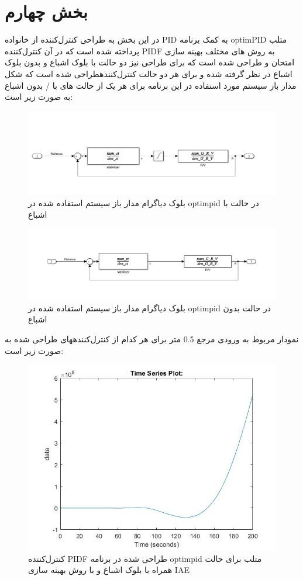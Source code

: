 \chapter{بخش چهارم}\label{part_IV}
در این بخش به طراحی کنترل‌کننده از خانواده  PID به کمک برنامه optimPID متلب پرداخته شده است که در آن کنترل‌کننده PIDF به روش های مختلف بهینه سازی امتحان و طراحی شده است که برای طراحی نیز دو حالت با بلوک اشباع و بدون بلوک اشباع در نظر گرفته شده و برای هر دو حالت کنترل‌کنندهطراحی شده است که شکل مدار باز سیستم مورد استفاده در این برنامه برای هر یک از حالت های با / بدون اشباع به صورت زیر است:

\begin{figure}[H]
	\centering
	\includegraphics[width=12cm]{../Figure/P_IV/OL_optimpid_with_sat.jpg}
	\caption{بلوک دیاگرام مدار باز سیستم استفاده شده در optimpid در حالت با اشباع}
\end{figure}

\begin{figure}[H]
	\centering
	\includegraphics[width=12cm]{../Figure/P_IV/OL_optimpid_without_sat.jpg}
	\caption{بلوک دیاگرام مدار باز سیستم استفاده شده در optimpid در حالت بدون اشباع}
\end{figure}



نمودار مربوط به ورودی مرجع 0.5 متر برای هر کدام از کنترل‌کنندههای طراحی شده به صورت زیر است:
\begin{figure}[H]
	\centering
	\includegraphics[width=12cm]{../Figure/P_IV/PID_IAE_with_sat.jpg}
	\caption{کنترل‌کننده PIDF طراحی شده در برنامه optimpid متلب برای حالت همراه با بلوک اشباع و با روش بهینه سازی IAE}
\end{figure}

